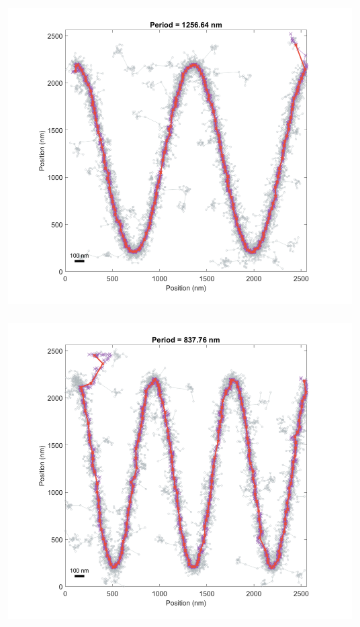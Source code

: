 \documentclass[10pt,a4paper]{article}
\begin{document}
\begin{enumerate}
\begin{figure}
			\begin{subfigure}[b]{.3\textwidth}
		\centering
		\includegraphics[width=\textwidth]{./figures/FitPoints2d_pts-800_period-1256.png}
		\caption[Step1]{}
		\label{fig:modDepth800_fDiv10}
	\end{subfigure}
	\begin{subfigure}[b]{.3\textwidth}
		\centering
		\includegraphics[width=\textwidth]{./figures/FitPoints2d_pts-800_period-837.png}
		\caption[Step2]{}
		\label{fig:modDepth800_fDiv15}

\end{subfigure}
\end{figure}
\end{enumerate}
\end{document}

